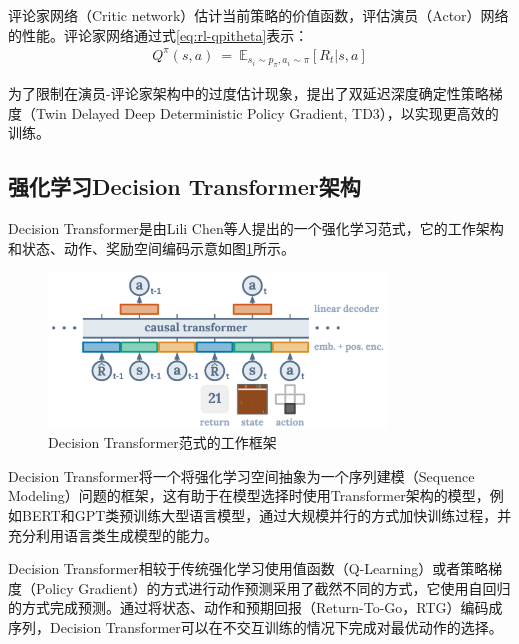 评论家网络（Critic network）估计当前策略的价值函数，评估演员（Actor）网络的性能。评论家网络通过式\eqref{eq:rl-qpitheta}表示：
\begin{equation}
\begin{aligned}
   Q^\pi(s,a)~=~\mathbb{E}_{s_i\sim p_\pi,a_i\sim\pi}\left[R_t|s,a\right]
\end{aligned}
\label{eq:rl-qpitheta}
\end{equation} 

为了限制在演员-评论家架构中的过度估计现象，提出了双延迟深度确定性策略梯度（Twin Delayed Deep Deterministic Policy Gradient, TD3）\cite{fujimoto2018addressing}，以实现更高效的训练。



\subsection{强化学习Decision Transformer架构}
Decision Transformer\cite{chen2021decision}是由Lili Chen等人提出的一个强化学习范式，它的工作架构和状态、动作、奖励空间编码示意如图\ref{fig:decision_trans_archi}所示。

\begin{figure} [ht]
\centering
\includegraphics[width=0.8\textwidth]{figures/chap02/decision_transformer.png} 
\caption{Decision Transformer范式的工作框架\cite{chen2021decision}}
\label{fig:decision_trans_archi}
\end{figure}

Decision Transformer将一个将强化学习空间抽象为一个序列建模（Sequence Modeling）问题的框架，这有助于在模型选择时使用Transformer架构的模型，例如BERT\cite{koroteev2021bert}和GPT\cite{achiam2023gpt}类预训练大型语言模型，通过大规模并行的方式加快训练过程，并充分利用语言类生成模型的能力。

Decision Transformer相较于传统强化学习使用值函数（Q-Learning）或者策略梯度（Policy Gradient）的方式进行动作预测采用了截然不同的方式，它使用自回归的方式完成预测。通过将状态、动作和预期回报（Return-To-Go，RTG）编码成序列，Decision Transformer可以在不交互训练的情况下完成对最优动作的选择。




